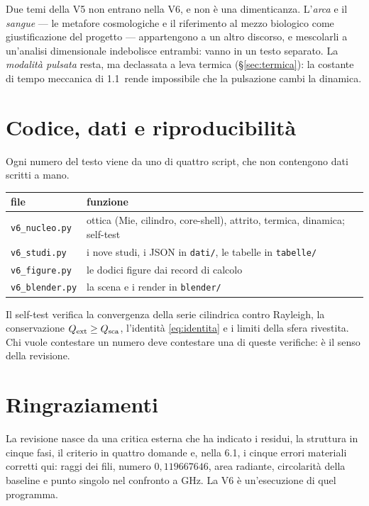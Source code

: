 \documentclass[11pt,a4paper]{article}
\providecommand{\toprule}{\hline}
\providecommand{\midrule}{\hline}
\providecommand{\bottomrule}{\hline}
\providecommand{\SI}[2]{#1\,\text{#2}}
\begin{document}
Due temi della V5 non entrano nella V6, e non \`e una dimenticanza. L'\emph{arca} e il
\emph{sangue} --- le metafore cosmologiche e il riferimento al mezzo biologico come
giustificazione del progetto --- appartengono a un altro discorso, e mescolarli a
un'analisi dimensionale indebolisce entrambi: vanno in un testo separato. La
\emph{modalit\`a pulsata} resta, ma declassata a leva termica
(\S\ref{sec:termica}): la costante di tempo meccanica di \SI{1.1}{ns} rende impossibile
che la pulsazione cambi la dinamica.

\section{Codice, dati e riproducibilit\`a}

Ogni numero del testo viene da uno di quattro script, che non contengono dati scritti
a mano.

\begin{center}\small
\begin{tabular}{p{3.4cm}p{9.4cm}}
\toprule
file & funzione \\
\midrule
\texttt{v6\_nucleo.py} & ottica (Mie, cilindro, core-shell), attrito, termica,
dinamica; self-test \\
\texttt{v6\_studi.py} & i nove studi, i JSON in \texttt{dati/}, le tabelle in
\texttt{tabelle/} \\
\texttt{v6\_figure.py} & le dodici figure dai record di calcolo \\
\texttt{v6\_blender.py} & la scena e i render in \texttt{blender/} \\
\bottomrule
\end{tabular}
\end{center}

Il self-test verifica la convergenza della serie cilindrica contro Rayleigh, la
conservazione $Q_{\rm ext}\ge Q_{\rm sca}$, l'identit\`a \eqref{eq:identita} e i
limiti della sfera rivestita. Chi vuole contestare un numero deve contestare una di
queste verifiche: \`e il senso della revisione.

\section*{Ringraziamenti}
La revisione nasce da una critica esterna che ha indicato i residui, la struttura in
cinque fasi, il criterio in quattro domande e, nella 6.1, i cinque errori materiali
corretti qui: raggi dei fili, numero $0{,}119667646$, area radiante, circolarit\`a
della baseline e punto singolo nel confronto a GHz. La V6 \`e un'esecuzione di quel
programma.
\end{document}
